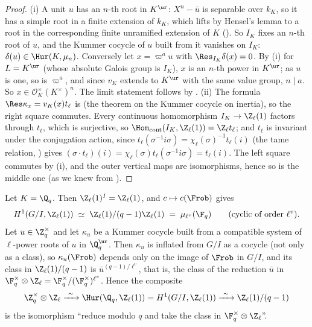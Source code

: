 \begin{proof}
(i) A unit $u$ has an $n$-th root in $K^{\ur}$: $X^n-\bar u$ is separable over $k_K$, so it has a simple root in a finite extension of $k_K$, which lifts by Hensel's lemma
to a root in the corresponding finite unramified extension of $K$ (). So $I_K$ fixes an $n$-th root of $u$, and the Kummer cocycle of $u$ built from it vanishes on $I_K$:
$\delta(u)\in\Hur(K,\mu_n)$. Conversely let $x=\varpi^au$ with $\Res_{I_K}\delta(x)=0$. By (i) for $L=K^{\ur}$ (whose absolute Galois group is
$I_K$), $x$ is an $n$-th power in $K^{\ur}$; as $u$ is one, so is $\varpi^a$, and since $v_K$ extends to $K^{\ur}$ with the same value group, $n\mid a$. So $x\in\mathcal O_K^\times(K^\times)^n$.
The limit statement follows by . (ii) The formula $\Res\kappa_x=v_K(x)t_\ell$ is  (the theorem on the Kummer cocycle on
inertia), so the right square commutes. Every continuous homomorphism $I_K\to\Z_\ell(1)$ factors through $t_\ell$, which is surjective, so
$\Hom_{\mathrm{cont}}(I_K,\Z_\ell(1))=\Z_\ell t_\ell$; and $t_\ell$ is invariant under the conjugation action, since $t_\ell(\sigma^{-1}i\sigma)=\chi_\ell(\sigma)^{-1}t_\ell(i)$
(the tame relation, ) gives $(\sigma\cdot t_\ell)(i)=\chi_\ell(\sigma)t_\ell(\sigma^{-1}i\sigma)=t_\ell(i)$. The left square commutes by (i), and the outer vertical
maps are isomorphisms, hence so is the middle one (as we knew from ).
\end{proof}

\begin{proposition}\label{prop:galcoh:unramified-value}
Let $K=\Q_q$. Then $\Z_\ell(1)^I=\Z_\ell(1)$, and $c\mapsto c(\Frob)$ gives
\[
H^1(G/I,\Z_\ell(1))\;\simeq\;\Z_\ell(1)/(q-1)\Z_\ell(1)\;=\;\mu_{\ell^v}(\F_q)\qquad(\text{cyclic of order }\ell^v).
\]
Let $u\in\Z_q^\times$ and let $\kappa_u$ be a Kummer cocycle built from a compatible system of $\ell$-power roots of $u$ in $\Q_q^{\ur}$. Then $\kappa_u$ is inflated from $G/I$
as a cocycle (not only as a class), so $\kappa_u(\Frob)$ depends only on the image of $\Frob$ in $G/I$, and its class in $\Z_\ell(1)/(q-1)$ is $\bar u^{(q-1)/\ell^v}$, that is, the
class of the reduction $\bar u$ in $\F_q^\times\otimes\Z_\ell=\F_q^\times/(\F_q^\times)^{\ell^v}$. Hence the composite
\[
\Z_q^\times\otimes\Z_\ell\xrightarrow{\ \sim\ }\Hur(\Q_q,\Z_\ell(1))=H^1(G/I,\Z_\ell(1))\xrightarrow{\ \sim\ }\Z_\ell(1)/(q-1)
\]
is the isomorphism ``reduce modulo $q$ and take the class in $\F_q^\times\otimes\Z_\ell$''.
\end{proposition}

